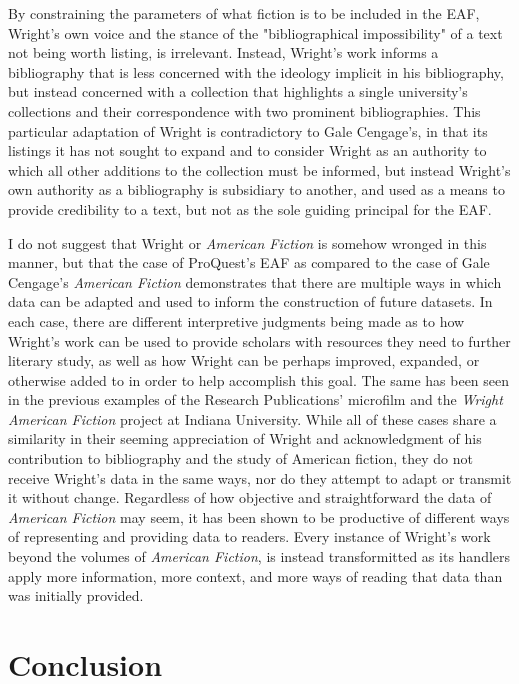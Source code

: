 By constraining the parameters of what fiction is to be included in the EAF, Wright's own voice and the stance of the "bibliographical impossibility" of a text not being worth listing, is irrelevant. Instead, Wright's work informs a bibliography that is less concerned with the ideology implicit in his bibliography, but instead concerned with a collection that highlights a single university's collections and their correspondence with two prominent bibliographies. This particular adaptation of Wright is contradictory to Gale Cengage's, in that its listings it has not sought to expand and to consider Wright as an authority to which all other additions to the collection must be informed, but instead Wright's own authority as a bibliography is subsidiary to another, and used as a means to provide credibility to a text, but not as the sole guiding principal for the EAF. 

I do not suggest that Wright or \textit{American Fiction} is somehow wronged in this manner, but that the case of ProQuest's EAF as compared to the case of Gale Cengage's \textit{American Fiction} demonstrates that there are multiple ways in which data can be adapted and used to inform the construction of future datasets. In each case, there are different interpretive judgments being made as to how Wright's work can be used to provide scholars with resources they need to further literary study, as well as how Wright can be perhaps improved, expanded, or otherwise added to in order to help accomplish this goal. The same has been seen in the previous examples of the Research Publications' microfilm and the \textit{Wright American Fiction} project at Indiana University. While all of these cases share a similarity in their seeming appreciation of Wright and acknowledgment of his contribution to bibliography and the study of American fiction, they do not receive Wright's data in the same ways, nor do they attempt to adapt or transmit it without change. Regardless of how objective and straightforward the data of \textit{American Fiction} may seem, it has been shown to be productive of different ways of representing and providing data to readers. Every instance of Wright's work beyond the volumes of \textit{American Fiction}, is instead transformitted as its handlers apply more information, more context, and more ways of reading that data than was initially provided. 

\section{Conclusion}

